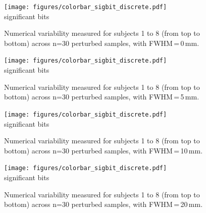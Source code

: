 \documentclass[lettersize,journal]{IEEEtran}
\begin{document}
{\begin{figure}
  \centering
  \vspace*{-20pt}\hspace{15pt}
  \texttt{[image: figures/colorbar\_sigbit\_discrete.pdf]} \\
  \vspace*{-5pt}
  significant bits
  \caption{Numerical variability measured for subjects 1 to 8 (from top to bottom) across n=30 perturbed samples, with FWHM\,=\,0\,mm. }
  \label{fig:uncertainty-maps-0mm-disc}
\end{figure}

\begin{figure}
  \centering
  \vspace*{-20pt}\hspace{15pt}
  \texttt{[image: figures/colorbar\_sigbit\_discrete.pdf]} \\
  \vspace*{-5pt}
  significant bits
  \caption{Numerical variability measured for subjects 1 to 8 (from top to bottom) across n=30 perturbed samples, with FWHM\,=\,5\,mm. }
  \label{fig:uncertainty-maps-5mm-disc}
\end{figure}

\begin{figure}
  \vspace*{-2cm}
  \centering
  \vspace*{-20pt}\hspace{15pt}
  \texttt{[image: figures/colorbar\_sigbit\_discrete.pdf]} \\
  \vspace*{-5pt}
  significant bits
  \caption{Numerical variability measured for subjects 1 to 8 (from top to bottom) across n=30 perturbed samples, with FWHM\,=\,10\,mm. }
  \label{fig:uncertainty-maps-10mm-disc}
\end{figure}

\begin{figure}
  \vspace*{-2cm}
  \centering
  \vspace*{-20pt}\hspace{15pt}
  \texttt{[image: figures/colorbar\_sigbit\_discrete.pdf]} \\
  \vspace*{-5pt}
  significant bits
  \caption{Numerical variability measured for subjects 1 to 8 (from top to bottom) across n=30 perturbed samples, with FWHM\,=\,20\,mm. }
  \label{fig:uncertainty-maps-20mm-disc}
\end{figure}


}
\end{document}
